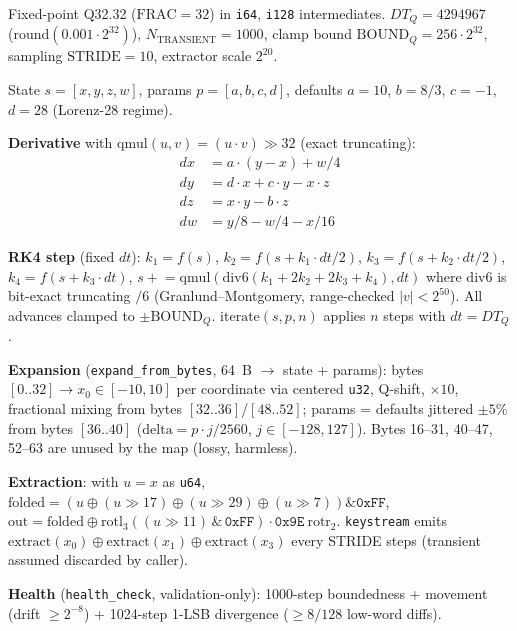 \documentclass[11pt,a4paper]{article}
\begin{document}
Fixed-point Q32.32 ($\mathrm{FRAC} = 32$) in \texttt{i64}, \texttt{i128}
intermediates. $DT_Q = 4294967$ (round$(0.001 \cdot 2^{32})$),
$N_{\mathrm{TRANSIENT}} = 1000$, clamp bound $\mathrm{BOUND}_Q = 256 \cdot 2^{32}$,
sampling $\mathrm{STRIDE} = 10$, extractor scale $2^{20}$.

State $s = [x,y,z,w]$, params $p = [a,b,c,d]$, defaults $a=10$, $b=8/3$,
$c=-1$, $d=28$ (Lorenz-28 regime).

\textbf{Derivative} with $\mathrm{qmul}(u,v) = (u \cdot v) \gg 32$ (exact
truncating):
\begin{align*}
dx &= a\cdot(y-x) + w/4 \\
dy &= d\cdot x + c\cdot y - x\cdot z \\
dz &= x\cdot y - b\cdot z \\
dw &= y/8 - w/4 - x/16
\end{align*}

\textbf{RK4 step} (fixed $dt$): $k_1 = f(s)$, $k_2 = f(s + k_1\cdot dt/2)$,
$k_3 = f(s + k_2\cdot dt/2)$, $k_4 = f(s + k_3\cdot dt)$,
$s \mathrel{+}= \mathrm{qmul}(\mathrm{div6}(k_1 + 2k_2 + 2k_3 + k_4), dt)$
where $\mathrm{div6}$ is bit-exact truncating $/6$ (Granlund--Montgomery,
range-checked $|v| < 2^{50}$). All advances clamped to $\pm\mathrm{BOUND}_Q$.
$\mathrm{iterate}(s,p,n)$ applies $n$ steps with $dt = DT_Q$.

\textbf{Expansion} (\texttt{expand\_from\_bytes}, 64~B $\to$ state + params):
bytes $[0..32] \to x_0 \in [-10,10]$ per coordinate via centered \texttt{u32},
Q-shift, $\times 10$, fractional mixing from bytes $[32..36]$/$[48..52]$;
params = defaults jittered $\pm 5\%$ from bytes $[36..40]$
($\mathrm{delta} = p\cdot j/2560$, $j \in [-128,127]$).
Bytes 16--31, 40--47, 52--63 are unused by the map (lossy, harmless).

\textbf{Extraction}: with $u = x$ as \texttt{u64},
$\mathrm{folded} = (u \oplus (u \gg 17) \oplus (u \gg 29) \oplus (u \gg 7))
\& \mathtt{0xFF}$,
$\mathrm{out} = \mathrm{folded} \oplus \mathrm{rotl}_3((u \gg 11)\,\&\,\mathtt{0xFF})
\cdot \mathtt{0x9E}\ \mathrm{rotr}_2$.
\texttt{keystream} emits $\mathrm{extract}(x_0) \oplus \mathrm{extract}(x_1) \oplus
\mathrm{extract}(x_3)$ every STRIDE steps (transient assumed discarded by caller).

\textbf{Health} (\texttt{health\_check}, validation-only): 1000-step boundedness +
movement (drift $\ge 2^{-8}$) + 1024-step 1-LSB divergence ($\ge 8/128$ low-word
diffs).

\end{document}
